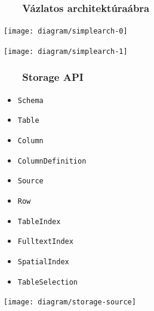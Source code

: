\documentclass[
]{beamer}
\newcommand{\slidetitle}[2]{\frametitle{{\small #1 ~ \ding{226} ~ } \normalsize \textbf{#2} }}
\begin{document}
\begin{frame}
    \slidetitle{\sectionshorttitle}{Vázlatos architektúraábra}
    
    \centering
    
    \begin{overprint}
        \centerline{\texttt{[image: diagram/simplearch-0]}}
        \centerline{\texttt{[image: diagram/simplearch-1]}}
    \end{overprint}
\end{frame}

\begin{frame}
    \slidetitle{\sectionshorttitle}{Storage API}
    
    \begin{minipage}[c]{0.5\textwidth}
        \begin{itemize}
            \item \texttt{Schema}
            \item \texttt{Table}
            \item \texttt{Column}
            \item \texttt{ColumnDefinition}
            \item {\texttt{Source}}
            \item \texttt{Row}
            \item \texttt{TableIndex}
            \item \texttt{FulltextIndex}
            \item \texttt{SpatialIndex}
            \item \texttt{TableSelection}
        \end{itemize}
    \end{minipage}%
    \begin{minipage}[c]{0.5\textwidth}
        \begin{overprint}
            \centerline{\texttt{[image: diagram/storage-source]}}
        \end{overprint}
    \end{minipage}
\end{frame}
\end{document}
